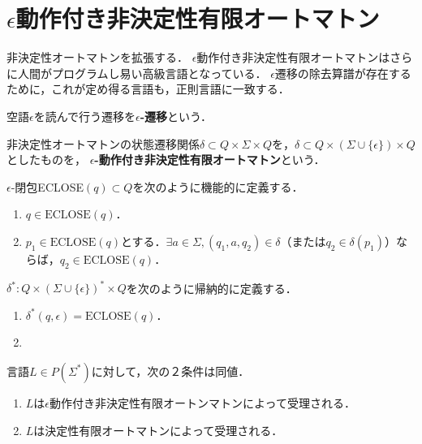 \documentclass[uplatex, dvipdfmx]{jsreport}
\begin{document}
\section{$\epsilon$動作付き非決定性有限オートマトン}

\begin{screen}
    非決定性オートマトンを拡張する．
    $\epsilon$動作付き非決定性有限オートマトンはさらに人間がプログラムし易い高級言語となっている．
    $\epsilon$遷移の除去算譜が存在するために，これが定め得る言語も，正則言語に一致する．
\end{screen}

\begin{definition}
    空語$\epsilon$を読んで行う遷移を\textbf{$\epsilon$-遷移}という．

    非決定性オートマトンの状態遷移関係$\delta\subset Q\times\Sigma\times Q$を，$\delta\subset Q\times(\Sigma\cup\{\epsilon\})\times Q$としたものを，
    \textbf{$\epsilon$-動作付き非決定性有限オートマトン}という．
\end{definition}

\begin{definition}
    $\epsilon$-閉包ECLOSE$(q)\subset Q$を次のように機能的に定義する．
    \begin{enumerate}
        \item $q\in\mathrm{ECLOSE}(q)$．
        \item $p_1\in\mathrm{ECLOSE}(q)$とする．$\exists a\in\Sigma, (q_1,a,q_2)\in\delta$（または$q_2\in\delta(p_1)$）ならば，$q_2\in\mathrm{ECLOSE}(q)$．
    \end{enumerate}
\end{definition}

\begin{definition}
    $\delta^*:Q\times(\Sigma\cup\{\epsilon\})^*\times Q$を次のように帰納的に定義する．
    \begin{enumerate}
        \item $\delta^*(q,\epsilon)=\mathrm{ECLOSE}(q)$．
        \item 
    \end{enumerate}
\end{definition}

\begin{theorem}
    言語$L\in P(\Sigma^*)$に対して，次の２条件は同値．
    \begin{enumerate}
        \item $L$は$\epsilon$動作付き非決定性有限オートンマトンによって受理される．
        \item $L$は決定性有限オートマトンによって受理される．
    \end{enumerate}
\end{theorem}
\end{document}

